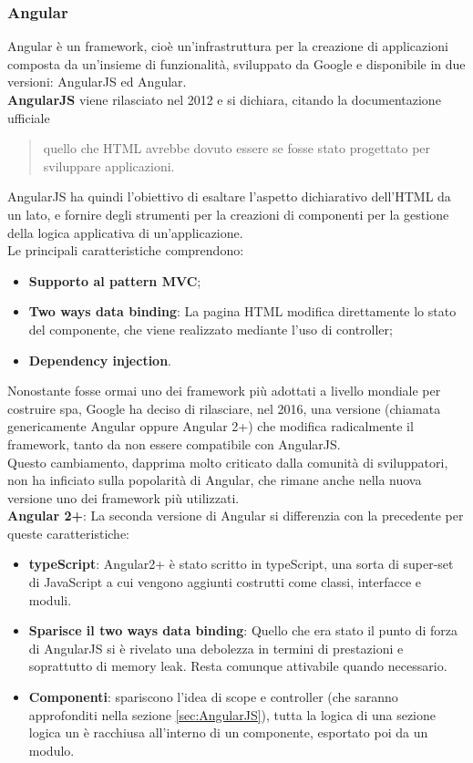\subsubsection{Angular}
Angular è un framework, cioè un'infrastruttura per la creazione di applicazioni composta da un'insieme di funzionalità, sviluppato da Google e disponibile in due versioni: AngularJS ed Angular.\\
\textbf{AngularJS} viene rilasciato nel 2012 e si dichiara, citando la documentazione ufficiale 
\begin{quote}
quello che HTML avrebbe dovuto essere se fosse stato progettato per sviluppare applicazioni.
\end{quote}  %
AngularJS ha quindi l'obiettivo di esaltare l'aspetto dichiarativo dell'HTML da un lato, e fornire degli strumenti per la creazioni di componenti per la gestione della logica applicativa di un'applicazione.\\
Le principali caratteristiche comprendono:
\begin{itemize}
	\item \textbf{Supporto al pattern MVC};
	\item \textbf{Two ways data binding}: La pagina HTML modifica direttamente lo stato del componente, che viene realizzato mediante l'uso di controller;
	\item \textbf{Dependency injection}. %
\end{itemize}
Nonostante fosse ormai uno dei \gls{framework} più adottati a livello mondiale per costruire \gls{spa}\glsfirstoccur, Google ha deciso di rilasciare, nel 2016, una versione (chiamata genericamente Angular oppure Angular 2+) che modifica radicalmente il \gls{framework}, tanto da non essere compatibile con AngularJS.\\
Questo cambiamento, dapprima molto criticato dalla comunità di sviluppatori, non ha inficiato sulla popolarità di Angular, che rimane anche nella nuova versione uno dei \gls{framework} più utilizzati.\\
\textbf{Angular 2+}: La seconda versione di Angular si differenzia con la precedente per queste caratteristiche:
\begin{itemize}
	\item \textbf{typeScript}: Angular2+ è stato scritto in typeScript, una sorta di super-set di JavaScript a cui vengono aggiunti costrutti come classi, interfacce e moduli.
	\item \textbf{Sparisce il two ways data binding}: Quello che era stato il punto di forza di AngularJS si è rivelato una debolezza in termini di prestazioni e soprattutto di memory leak. Resta comunque attivabile quando necessario.
	\item \textbf{Componenti}: spariscono l'idea di scope e controller (che saranno approfonditi nella sezione \ref{sec:AngularJS}), tutta la logica di una sezione logica un è racchiusa all'interno di un componente, esportato poi da un modulo. %
\end{itemize}
